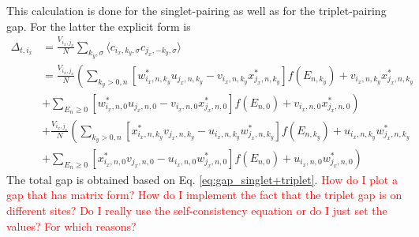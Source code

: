 This calculation is done for the singlet-pairing as well as for the triplet-pairing gap.
For the latter the explicit form is
\begin{align} \nonumber
    \Delta_{t,i_x} &= \frac{V_{i_x, j_x}}{N} \sum_{k_y, \sigma} \langle c_{i_x, k_y, \sigma}c_{j_x, -k_y, \sigma}\rangle\\ \nonumber
    &= \frac{V_{i_x, j_x}}{N} \left( \sum_{k_y >0,n} \left[ w^*_{i_x,n,k_y}u_{j_x,n,k_y}-v_{i_x,n,k_y}x^*_{j_x,n,k_y}\right]f(E_{n,k_y}) +v_{i_x,n,k_y}x^*_{j_x,n,k_y} \right. \\ \nonumber
    &+ \left.\sum_{E_n \geq0} \left[ w^*_{i_x,n,0}u_{j_x,n,0}-v_{i_x,n,0}x^*_{j_x,n,0}\right]f(E_{n,0})+ v_{i_x,n,0}x^*_{j_x,n,0} \right) \\ \nonumber
    &+ \frac{V_{i_x, j_x}}{N} \left( \sum_{k_y >0,n} \left[ x^*_{i_x,n,k_y}v_{j_x,n,k_y}-u_{i_x,n,k_y}w^*_{j_x,n,k_y}\right]f(E_{n,k_y}) +u_{i_x,n,k_y}w^*_{j_x,n,k_y} \right. \\
    &+ \left.\sum_{E_n \geq0} \left[ x^*_{i_x,n,0}v_{j_x,n,0}-u_{i_x,n,0}w^*_{j_x,n,0}\right]f(E_{n,0})+ u_{i_x,n,0}w^*_{j_x,n,0} \right) 
    \label{eq:gap_triplet_num}
\end{align}
The total gap is obtained based on Eq. \ref{eq:gap_singlet+triplet}. \newline
\textcolor{red}{How do I plot a gap that has matrix form?} \newline
\textcolor{red}{How do I implement the fact that the triplet gap is on different sites?} \newline
\textcolor{red}{Do I really use the self-consistency equation or do I just set the values? For which reasons?}

